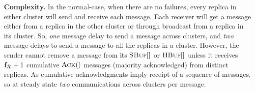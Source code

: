 {\bf Complexity.}
In the normal-case, when there are no failures, every replica in either cluster will send and receive each message.
Each receiver will get a message either from a replica in the other cluster or through broadcast from a replica in its cluster. 
So, {\em one} message delay to send a message across clusters, and {\em two} message delays to send a message to all the replicas in a cluster.
However, the sender cannot remove a message from its $\textsc{SBuf}[{}]$ or $\textsc{HBuf}[{}]$ unless it receives $\textbf{f}_{\mathcal{R}_{\mathcal{}}}+1$ cumulative $\textsc{Ack}()$ messages (majority acknowledged) 
from distinct replicas.
As cumulative acknowledgments imply  receipt of a sequence of messages, so at steady state {\em two} communications across clusters 
per message.






